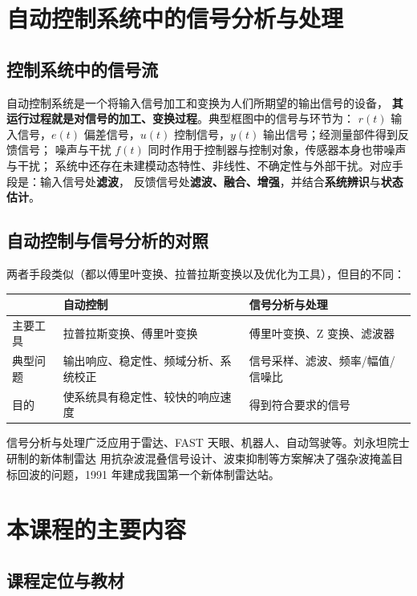 \section{自动控制系统中的信号分析与处理}

\subsection{控制系统中的信号流}

自动控制系统是一个将输入信号加工和变换为人们所期望的输出信号的设备，
\textbf{其运行过程就是对信号的加工、变换过程}。典型框图中的信号与环节为：
$r(t)$ 输入信号，$e(t)$ 偏差信号，$u(t)$ 控制信号，$y(t)$ 输出信号；经测量部件得到反馈信号；
噪声与干扰 $f(t)$ 同时作用于控制器与控制对象，传感器本身也带噪声与干扰；
系统中还存在未建模动态特性、非线性、不确定性与外部干扰。对应手段是：输入信号处\textbf{滤波}，
反馈信号处\textbf{滤波、融合、增强}，并结合\textbf{系统辨识}与\textbf{状态估计}。

\subsection{自动控制与信号分析的对照}

两者手段类似（都以傅里叶变换、拉普拉斯变换以及优化为工具），但目的不同：

\begin{center}
\begin{tabular}{lll}
\toprule
 & 自动控制 & 信号分析与处理 \\
\midrule
主要工具 & 拉普拉斯变换、傅里叶变换 & 傅里叶变换、Z 变换、滤波器 \\
典型问题 & 输出响应、稳定性、频域分析、系统校正 & 信号采样、滤波、频率/幅值/信噪比 \\
目的 & 使系统具有稳定性、较快的响应速度 & 得到符合要求的信号 \\
\bottomrule
\end{tabular}
\end{center}

信号分析与处理广泛应用于雷达、FAST 天眼、机器人、自动驾驶等。刘永坦院士研制的新体制雷达
用抗杂波混叠信号设计、波束抑制等方案解决了强杂波掩盖目标回波的问题，1991 年建成我国第一个新体制雷达站。

\section{本课程的主要内容}

\subsection{课程定位与教材}

